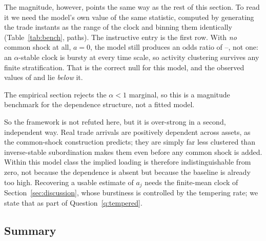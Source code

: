 \documentclass{ws-ijtaf}
\begin{document}
The magnitude, however, points the same way as the rest of this section. To
read it we need the model's own value of the same statistic, computed by
generating the trade instants as the range of the clock and binning them
identically (Table~\ref{tab:bench}, \benchPaths{} paths). The instructive entry
is the first row. With \emph{no} common shock at all, $a=0$, the model still
produces an odds ratio of \benchNullLo{}--\benchNullHi{}, not one: an
$\alpha$-stable clock is bursty at every time scale, so activity clustering
survives any finite stratification. That is the correct null for this model, and
the observed values of \jsCryMH{} and \jsHosMH{} lie \emph{below} it.

\begin{table}[b]
{}
\begin{tabnote}
The empirical section rejects the $\alpha<1$ marginal, so this is a magnitude
benchmark for the dependence structure, not a fitted model.
\end{tabnote}
\label{tab:bench}
\end{table}

So the framework is not refuted here, but it is over-strong in a second,
independent way. Real trade arrivals are positively dependent across assets, as
the common-shock construction predicts; they are simply far less clustered than
inverse-stable subordination makes them even before any common shock is added.
Within this model class the implied loading is therefore indistinguishable from
zero, not because the dependence is absent but because the baseline is already
too high. Recovering a usable estimate of $a_j$ needs the finite-mean clock of
Section~\ref{sec:discussion}, whose burstiness is controlled by the tempering
rate; we state that as part of Question~\ref{q:tempered}.

\subsection{Summary}
\end{document}
